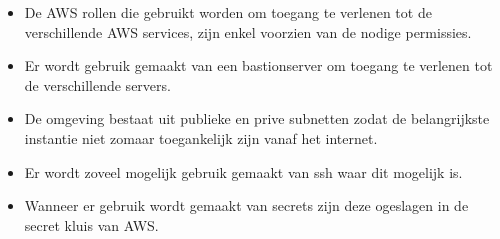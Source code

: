 \begin{itemize}
  \item De AWS rollen die gebruikt worden om toegang te verlenen tot de verschillende AWS services, zijn enkel voorzien van de nodige permissies.
  \item Er wordt gebruik gemaakt van een bastionserver om toegang te verlenen tot de verschillende servers.
  \item De omgeving bestaat uit publieke en prive subnetten zodat de belangrijkste instantie niet zomaar toegankelijk zijn vanaf het internet.
  \item Er wordt zoveel mogelijk gebruik gemaakt van ssh waar dit mogelijk is.
  \item Wanneer er gebruik wordt gemaakt van secrets zijn deze ogeslagen in de secret kluis van AWS.
\end{itemize}